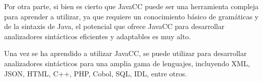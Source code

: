 Por otra parte, si bien es cierto que JavaCC puede ser una herramienta compleja para aprender a utilizar, ya que requiere un conocimiento básico de gramáticas y de la sintaxis de Java, el potencial que ofrece JavaCC para desarrollar analizadores sintácticos eficientes y adaptables es muy alto.

Una vez se ha aprendido a utilizar JavaCC, se puede utilizar para desarrollar analizadores sintácticos para una amplia gama de lenguajes, incluyendo XML, JSON, HTML, C++, PHP, Cobol, SQL, IDL, entre otros\cite{javaccgithub}.